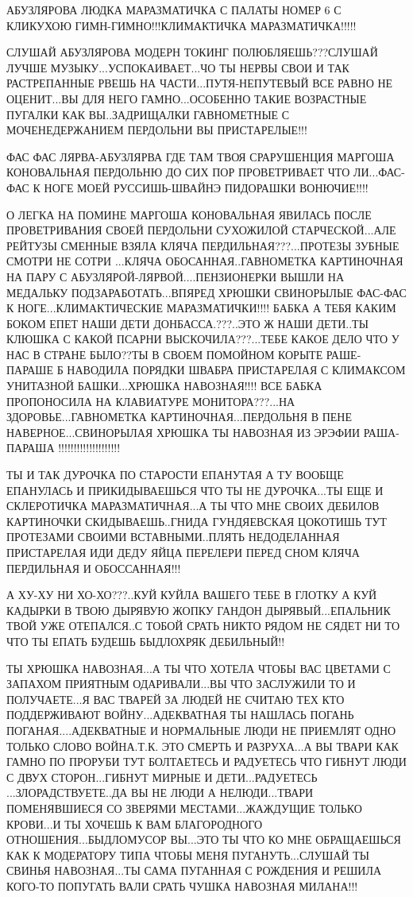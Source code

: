 АБУЗЛЯРОВА ЛЮДКА МАРАЗМАТИЧКА С ПАЛАТЫ НОМЕР 6 С КЛИКУХОЮ
ГИМН-ГИМНО!!!КЛИМАКТИЧКА МАРАЗМАТИЧКА!!!!! 

СЛУШАЙ АБУЗЛЯРОВА МОДЕРН ТОКИНГ ПОЛЮБЛЯЕШЬ???СЛУШАЙ ЛУЧШЕ
МУЗЫКУ...УСПОКАИВАЕТ...ЧО ТЫ НЕРВЫ СВОИ И ТАК РАСТРЕПАННЫЕ РВЕШЬ НА
ЧАСТИ...ПУТЯ-НЕПУТЕВЫЙ ВСЕ РАВНО НЕ ОЦЕНИТ...ВЫ ДЛЯ НЕГО ГАМНО...ОСОБЕННО ТАКИЕ
ВОЗРАСТНЫЕ ПУГАЛКИ КАК ВЫ..ЗАДРИЩАЛКИ ГАВНОМЕТНЫЕ С МОЧЕНЕДЕРЖАНИЕМ ПЕРДОЛЬНИ
ВЫ ПРИСТАРЕЛЫЕ!!! 

ФАС ФАС ЛЯРВА-АБУЗЛЯРВА ГДЕ ТАМ ТВОЯ СРАРУШЕНЦИЯ МАРГОША КОНОВАЛЬНАЯ ПЕРДОЛЬНЮ
ДО СИХ ПОР ПРОВЕТРИВАЕТ ЧТО ЛИ...ФАС-ФАС К НОГЕ МОЕЙ РУССИШЬ-ШВАЙНЭ ПИДОРАШКИ
ВОНЮЧИЕ!!!! 

О ЛЕГКА НА ПОМИНЕ МАРГОША КОНОВАЛЬНАЯ ЯВИЛАСЬ ПОСЛЕ ПРОВЕТРИВАНИЯ СВОЕЙ
ПЕРДОЛЬНИ СУХОЖИЛОЙ СТАРЧЕСКОЙ...АЛЕ РЕЙТУЗЫ СМЕННЫЕ ВЗЯЛА КЛЯЧА
ПЕРДИЛЬНАЯ???...ПРОТЕЗЫ ЗУБНЫЕ СМОТРИ НЕ СОТРИ ...КЛЯЧА ОБОСАННАЯ..ГАВНОМЕТКА
КАРТИНОЧНАЯ НА ПАРУ С АБУЗЛЯРОЙ-ЛЯРВОЙ....ПЕНЗИОНЕРКИ ВЫШЛИ НА МЕДАЛЬКУ
ПОДЗАРАБОТАТЬ...ВПЯРЕД ХРЮШКИ СВИНОРЫЛЫЕ ФАС-ФАС К НОГЕ...КЛИМАКТИЧЕСКИЕ
МАРАЗМАТИЧКИ!!!!
БАБКА А ТЕБЯ КАКИМ БОКОМ ЕПЕТ НАШИ ДЕТИ ДОНБАССА.???..ЭТО Ж НАШИ ДЕТИ..ТЫ
КЛЮШКА С КАКОЙ ПСАРНИ ВЫСКОЧИЛА???...ТЕБЕ КАКОЕ ДЕЛО ЧТО У НАС В СТРАНЕ
БЫЛО??ТЫ В СВОЕМ ПОМОЙНОМ КОРЫТЕ РАШЕ-ПАРАШЕ Б НАВОДИЛА ПОРЯДКИ ШВАБРА
ПРИСТАРЕЛАЯ С КЛИМАКСОМ УНИТАЗНОЙ БАШКИ...ХРЮШКА НАВОЗНАЯ!!!!     ВСЕ БАБКА
ПРОПОНОСИЛА НА КЛАВИАТУРЕ МОНИТОРА???...НА ЗДОРОВЬЕ...ГАВНОМЕТКА
КАРТИНОЧНАЯ...ПЕРДОЛЬНЯ В ПЕНЕ НАВЕРНОЕ...СВИНОРЫЛАЯ ХРЮШКА ТЫ НАВОЗНАЯ ИЗ
ЭРЭФИИ РАША-ПАРАША !!!!!!!!!!!!!!!!!!!!       

ТЫ И ТАК ДУРОЧКА ПО СТАРОСТИ ЕПАНУТАЯ А ТУ ВООБЩЕ ЕПАНУЛАСЬ И ПРИКИДЫВАЕШЬСЯ
ЧТО ТЫ НЕ ДУРОЧКА...ТЫ ЕЩЕ И СКЛЕРОТИЧКА МАРАЗМАТИЧНАЯ...А ТЫ ЧТО МНЕ СВОИХ
ДЕБИЛОВ КАРТИНОЧКИ СКИДЫВАЕШЬ..ГНИДА ГУНДЯЕВСКАЯ ЦОКОТИШЬ ТУТ ПРОТЕЗАМИ СВОИМИ
ВСТАВНЫМИ..ПЛЯТЬ НЕДОДЕЛАННАЯ ПРИСТАРЕЛАЯ ИДИ ДЕДУ ЯЙЦА ПЕРЕЛЕРИ ПЕРЕД СНОМ
КЛЯЧА ПЕРДИЛЬНАЯ И ОБОССАННАЯ!!! 

А ХУ-ХУ НИ ХО-ХО???..КУЙ КУЙЛА ВАШЕГО ТЕБЕ В ГЛОТКУ А КУЙ КАДЫРКИ В ТВОЮ
ДЫРЯВУЮ ЖОПКУ ГАНДОН ДЫРЯВЫЙ...ЕПАЛЬНИК ТВОЙ УЖЕ ОТЕПАЛСЯ..С ТОБОЙ СРАТЬ НИКТО
РЯДОМ НЕ СЯДЕТ НИ ТО ЧТО ТЫ ЕПАТЬ БУДЕШЬ БЫДЛОХРЯК ДЕБИЛЬНЫЙ!!       

ТЫ ХРЮШКА НАВОЗНАЯ...А ТЫ ЧТО ХОТЕЛА ЧТОБЫ ВАС ЦВЕТАМИ С ЗАПАХОМ ПРИЯТНЫМ
ОДАРИВАЛИ...ВЫ ЧТО ЗАСЛУЖИЛИ ТО И ПОЛУЧАЕТЕ...Я ВАС ТВАРЕЙ ЗА ЛЮДЕЙ НЕ СЧИТАЮ
ТЕХ КТО ПОДДЕРЖИВАЮТ ВОЙНУ...АДЕКВАТНАЯ ТЫ НАШЛАСЬ ПОГАНЬ ПОГАНАЯ....АДЕКВАТНЫЕ
И НОРМАЛЬНЫЕ ЛЮДИ НЕ ПРИЕМЛЯТ ОДНО ТОЛЬКО СЛОВО ВОЙНА.Т.К. ЭТО СМЕРТЬ И
РАЗРУХА...А ВЫ ТВАРИ КАК ГАМНО ПО ПРОРУБИ ТУТ БОЛТАЕТЕСЬ И  РАДУЕТЕСЬ ЧТО
ГИБНУТ ЛЮДИ С ДВУХ СТОРОН...ГИБНУТ МИРНЫЕ И ДЕТИ...РАДУЕТЕСЬ
...ЗЛОРАДСТВУЕТЕ..ДА ВЫ НЕ ЛЮДИ А НЕЛЮДИ...ТВАРИ ПОМЕНЯВШИЕСЯ СО ЗВЕРЯМИ
МЕСТАМИ...ЖАЖДУЩИЕ ТОЛЬКО КРОВИ...И ТЫ ХОЧЕШЬ К ВАМ БЛАГОРОДНОГО
ОТНОШЕНИЯ...БЫДЛОМУСОР ВЫ...ЭТО ТЫ ЧТО КО МНЕ ОБРАЩАЕШЬСЯ КАК К МОДЕРАТОРУ ТИПА
ЧТОБЫ МЕНЯ ПУГАНУТЬ...СЛУШАЙ ТЫ СВИНЬЯ НАВОЗНАЯ...ТЫ САМА ПУГАННАЯ С РОЖДЕНИЯ И
РЕШИЛА КОГО-ТО ПОПУГАТЬ ВАЛИ СРАТЬ ЧУШКА НАВОЗНАЯ МИЛАНА!!!    

